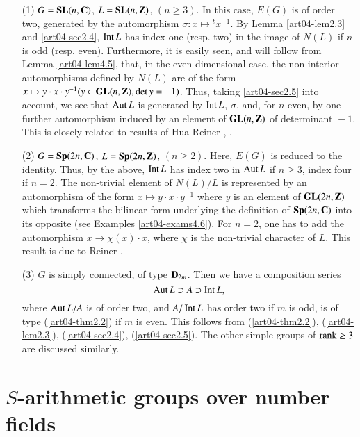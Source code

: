 \setcounter{theorem}{5}
\begin{examples}\label{art04-exams2.6}
\begin{itemize}
\item[(1)] $G=\mathbf{SL}(n,\mathbf{C})$, $L=\mathbf{SL}(n,\mathbf{Z})$, $(n\geq 3)$. In this case, $E(G)$ is of order two, generated by the automorphism $\sigma:x\mapsto {}^{t}x^{-1}$. By Lemma \ref{art04-lem2.3} and \ref{art04-sec2.4}, $\operatorname{\mathrm{Int}} L$ has index one (resp. two) in the image of $N(L)$ if $n$ is odd (resp. even). Furthermore, it is easily seen, and will follow from Lemma \ref{art04-lem4.5}, that, in the even dimensional case, the non-interior automorphisms defined by $N(L)$ are of the form $x\mapsto y\cdot x\cdot y^{-1}(y\in \mathbf{GL}(n,\mathbf{Z}), \det y=-1)$. Thus, taking \ref{art04-sec2.5} into account, we see that $\operatorname{\mathrm{Aut}} L$ is generated by $\operatorname{\mathrm{Int}} L$, $\sigma$, and, for $n$ even, by one further automorphism induced by an element of $\mathbf{GL}(n,\mathbf{Z})$ of determinant ${}-1$. This is closely related to results of Hua-Reiner \cite{art04-key12}, \cite{art04-key13}.

\item[(2)] $G=\mathbf{Sp}(2n,\mathbf{C})$, $L=\mathbf{Sp}(2n,\mathbf{Z})$, $(n\geq 2)$. Here, $E(G)$ is reduced to the identity. Thus, by the above, $\operatorname{\mathrm{Int}} L$ has index two in $\operatorname{\mathrm{Aut}} L$ if $n\geq 3$, index four if $n=2$. The non-trivial element of $N(L)/L$ is represented by an automorphism of the form $x\mapsto y\cdot x\cdot y^{-1}$ where $y$ is an element of $\mathbf{GL}(2n,\mathbf{Z})$ which transforms the bilinear form underlying the definition of $\mathbf{Sp}(2n,\mathbf{C})$ into its opposite (see Examples \ref{art04-exams4.6}). For $n=2$, one has to add the automorphism $x\to \chi(x)\cdot x$, where $\chi$ is the non-trivial character of $L$. This result is due to Reiner \cite{art04-key27}.

\item[(3)] $G$ is simply connected, of type $\mathbf{D}_{2m}$. Then we have a composition series
$$
\operatorname{\mathrm{Aut}} L\supset A\supset \operatorname{\mathrm{Int}} L,
$$
where $\operatorname{\mathrm{Aut}} L/A$ is of order two, and $A/\operatorname{\mathrm{Int}} L$ has order two if $m$ is odd, is of type (\ref{art04-thm2.2}) if $m$ is even. This follows from (\ref{art04-thm2.2}), (\ref{art04-lem2.3}), (\ref{art04-sec2.4}), (\ref{art04-sec2.5}). The other simple groups of $\operatorname{\mathrm{rank}} \geq 3$ are discussed similarly.
\end{itemize}
\end{examples}

\section{$S$-arithmetic groups over number fields}\label{art04-sec3}
\pageoriginale

